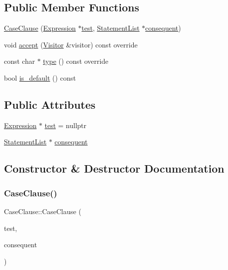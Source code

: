 \subsection*{Public Member Functions}
\begin{DoxyCompactItemize}
\item 
\hyperlink{struct_case_clause_a05d8bf165e3a4796247b5fbf1f71d3e5}{Case\+Clause} (\hyperlink{struct_expression}{Expression} $\ast$\hyperlink{struct_case_clause_a80b6f256f3d9910250e4b8433ea75d7f}{test}, \hyperlink{struct_statement_list}{Statement\+List} $\ast$\hyperlink{struct_case_clause_a3e6914411610d1893b61172521e11288}{consequent})
\item 
void \hyperlink{struct_case_clause_a5bbee9ea9ca206c09b8b79f8c96720a1}{accept} (\hyperlink{struct_visitor}{Visitor} \&visitor) const override
\item 
const char $\ast$ \hyperlink{struct_case_clause_a9dcb0a1a072df7d577b272c6bbb3c6dc}{type} () const override
\item 
bool \hyperlink{struct_case_clause_a8ef15339531ef33d3ae335d96317b30a}{is\+\_\+default} () const
\end{DoxyCompactItemize}
\subsection*{Public Attributes}
\begin{DoxyCompactItemize}
\item 
\hyperlink{struct_expression}{Expression} $\ast$ \hyperlink{struct_case_clause_a80b6f256f3d9910250e4b8433ea75d7f}{test} = nullptr
\item 
\hyperlink{struct_statement_list}{Statement\+List} $\ast$ \hyperlink{struct_case_clause_a3e6914411610d1893b61172521e11288}{consequent}
\end{DoxyCompactItemize}


\subsection{Constructor \& Destructor Documentation}
\mbox{\label{struct_case_clause_a05d8bf165e3a4796247b5fbf1f71d3e5}} 
\subsubsection{\texorpdfstring{Case\+Clause()}{CaseClause()}}
{\footnotesize\ttfamily Case\+Clause\+::\+Case\+Clause (\begin{DoxyParamCaption}\item[{\hyperlink{struct_expression}{Expression} $\ast$}]{test,  }\item[{\hyperlink{struct_statement_list}{Statement\+List} $\ast$}]{consequent }\end{DoxyParamCaption})\hspace{0.3cm}{\ttfamily [inline]}}



